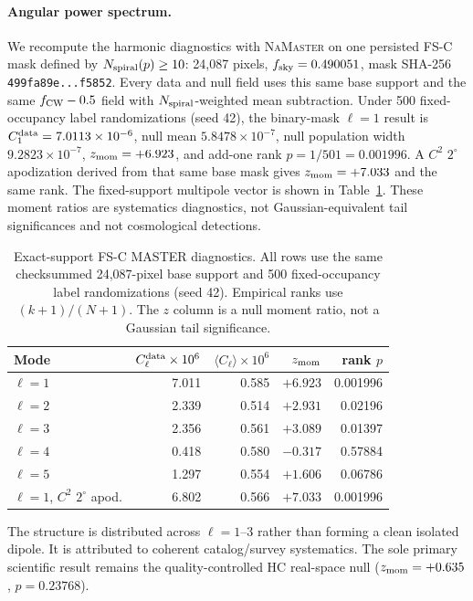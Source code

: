 \documentclass[twocolumn,linenumbers]{aastex702}
\newcommand{\FSC}{\textsc{FS-C}}
\begin{document}
\paragraph{Angular power spectrum.}
We recompute the harmonic diagnostics with \textsc{NaMaster} on one persisted \FSC{} mask defined by $N_{\rm spiral}(p)\geq10$: 24,087 pixels, $f_{\rm sky}=0.490051$, mask SHA-256 \texttt{499fa89e...f5852}. Every data and null field uses this same base support and the same $f_{\rm CW}-0.5$ field with $N_{\rm spiral}$-weighted mean subtraction. Under 500 fixed-occupancy label randomizations (seed 42), the binary-mask $\ell=1$ result is $C_1^{\rm data}=7.0113\times10^{-6}$, null mean $5.8478\times10^{-7}$, null population width $9.2823\times10^{-7}$, $z_{\rm mom}=+6.923$, and add-one rank $p=1/501=0.001996$. A $C^2$ $2^\circ$ apodization derived from that same base mask gives $z_{\rm mom}=+7.033$ and the same rank. The fixed-support multipole vector is shown in Table~\ref{tab:multipole}. These moment ratios are systematics diagnostics, not Gaussian-equivalent tail significances and not cosmological detections.

\begin{table}[tbp]
\caption{Exact-support \FSC{} MASTER diagnostics. All rows use the same checksummed 24,087-pixel base support and 500 fixed-occupancy label randomizations (seed 42). Empirical ranks use $(k+1)/(N+1)$. The $z$ column is a null moment ratio, not a Gaussian tail significance.\label{tab:multipole}}
\begin{tabular}{lrrrr}
\textbf{Mode} & $C_\ell^{\rm data}\times10^6$ & $\langle C_\ell\rangle\times10^6$ & $z_{\rm mom}$ & \textbf{rank $p$} \\
\hline
$\ell=1$ & 7.011 & 0.585 & $+6.923$ & 0.001996 \\
$\ell=2$ & 2.339 & 0.514 & $+2.931$ & 0.02196 \\
$\ell=3$ & 2.356 & 0.561 & $+3.089$ & 0.01397 \\
$\ell=4$ & 0.418 & 0.580 & $-0.317$ & 0.57884 \\
$\ell=5$ & 1.297 & 0.554 & $+1.606$ & 0.06786 \\
\hline
$\ell=1$, $C^2$ $2^\circ$ apod. & 6.802 & 0.566 & $+7.033$ & 0.001996 \\
\end{tabular}
\end{table}

\noindent The structure is distributed across $\ell=1$--3 rather than forming a clean isolated dipole. It is attributed to coherent catalog/survey systematics. The sole primary scientific result remains the quality-controlled HC real-space null ($z_{\rm mom}=+0.635$, $p=0.23768$).
\end{document}
